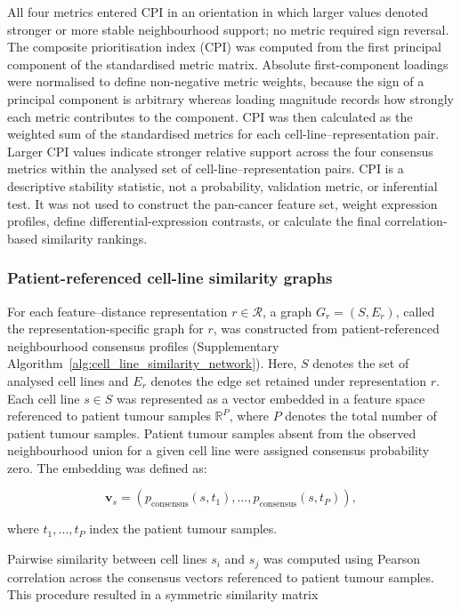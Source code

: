 All four metrics entered CPI in an orientation in which larger values denoted
stronger or more stable neighbourhood support; no metric required sign reversal. The
composite prioritisation index (CPI) was computed from the first principal
component of the standardised metric matrix. Absolute first-component loadings
were normalised to define non-negative metric weights, because the sign of a
principal component is arbitrary whereas loading magnitude records how strongly
each metric contributes to the component. CPI was then calculated as the
weighted sum of the standardised metrics for each cell-line--representation
pair. Larger CPI values indicate stronger relative support across the four
consensus metrics within the analysed set of cell-line--representation pairs.
CPI is a descriptive stability statistic, not a probability, validation metric,
or inferential test. It was not used to construct the pan-cancer feature set,
weight expression profiles, define differential-expression contrasts, or
calculate the final correlation-based similarity rankings.

\subsubsection{Patient-referenced cell-line similarity graphs}

For each feature--distance representation \(r\in\mathcal{R}\), a graph
\(G_r=(S,E_r)\), called the representation-specific graph for \(r\), was constructed
from patient-referenced neighbourhood consensus profiles (Supplementary
Algorithm~\ref{alg:cell_line_similarity_network}).
Here, \(S\) denotes the set of analysed cell lines and
\(E_r\) denotes the edge set retained under representation \(r\).
Each cell line \(s \in S\) was represented as a vector embedded in a
feature space referenced to patient tumour samples
$\mathbb{R}^{P}$, where $P$ denotes the total number of
patient tumour samples. Patient tumour samples absent from the observed
neighbourhood union for a given cell line were assigned consensus probability
zero. The embedding was defined as:

\begin{equation}
\mathbf{v}_s =
\left(
p_{\mathrm{consensus}}(s,t_1), \ldots,
p_{\mathrm{consensus}}(s,t_P)
\right),
\end{equation}

where $t_1, \ldots, t_P$ index the patient tumour samples.

Pairwise similarity between cell lines $s_i$ and $s_j$
was computed using Pearson correlation across the consensus vectors
referenced to patient tumour samples.
This procedure resulted in a symmetric similarity matrix

